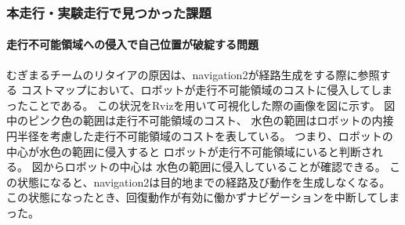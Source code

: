 \subsubsection{本走行・実験走行で見つかった課題}
\paragraph{走行不可能領域への侵入で自己位置が破綻する問題}
むぎまるチームのリタイアの原因は、navigation2が経路生成をする際に参照する
コストマップにおいて、ロボットが走行不可能領域のコストに侵入してしまったことである。
この状況をRvizを用いて可視化した際の画像を図\label{fig:mugimaru_result}に示す。
図中のピンク色の範囲は走行不可能領域のコスト、
水色の範囲はロボットの内接円半径を考慮した走行不可能領域のコストを表している。
つまり、ロボットの中心が水色の範囲に侵入すると
ロボットが走行不可能領域にいると判断される。
図\label{fig:mugimaru_result}からロボットの中心は
水色の範囲に侵入していることが確認できる。
この状態になると、navigation2は目的地までの経路及び動作を生成しなくなる。
この状態になったとき、回復動作が有効に働かずナビゲーションを中断してしまった。

